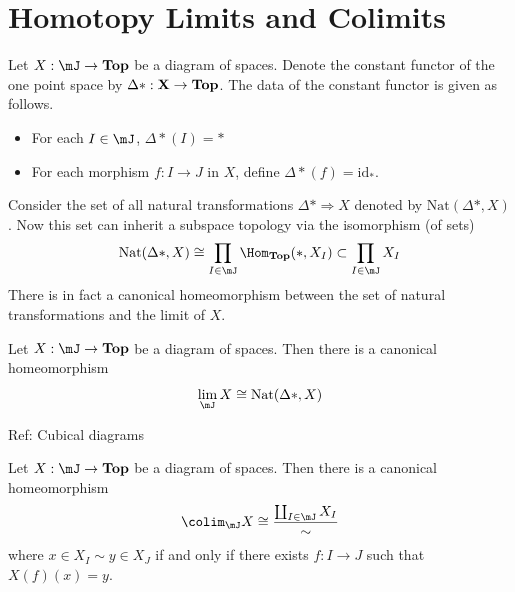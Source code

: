\documentclass[a4paper]{article}
\begin{document}
\pagebreak
\section{Homotopy Limits and Colimits}

Let $X:\mJ\to\bold{Top}$ be a diagram of spaces. Denote the constant functor of the one point space by $\Delta\ast:\bold{X}\to\bold{Top}$. The data of the constant functor is given as follows. 
\begin{itemize}
\item For each $I\in\mJ$, $\Delta\ast(I)=\ast$
\item For each morphism $f:I\to J$ in $X$, define $\Delta\ast(f)=\text{id}_\ast$. 
\end{itemize}
Consider the set of all natural transformations $\Delta\ast\Rightarrow X$ denoted by $\text{Nat}(\Delta\ast,X)$. Now this set can inherit a subspace topology via the isomorphism (of sets) $$\text{Nat}(\Delta\ast,X)\cong\prod_{I\in\mJ}\Hom_\bold{Top}(\ast,X_I)\subset\prod_{I\in\mJ}X_I$$ There is in fact a canonical homeomorphism between the set of natural transformations and the limit of $X$. 

\begin{thm}{}{} Let $X:\mJ\to\bold{Top}$ be a diagram of spaces. Then there is a canonical homeomorphism $$\lim_\mJ X\cong\text{Nat}(\Delta\ast,X)$$
\end{thm}
Ref: Cubical diagrams

\begin{thm}{}{} Let $X:\mJ\to\bold{Top}$ be a diagram of spaces. Then there is a canonical homeomorphism $$\colim_\mJ X\cong\frac{\coprod_{I\in\mJ}X_I}{\sim}$$ where $x\in X_I\sim y\in X_J$ if and only if there exists $f:I\to J$ such that $X(f)(x)=y$. 
\end{thm}
\end{document}
